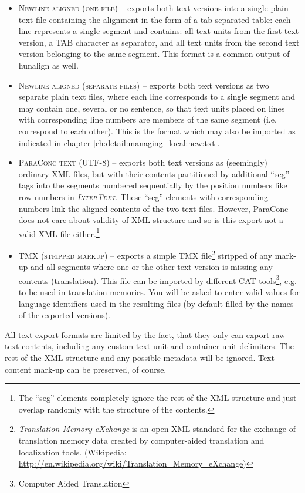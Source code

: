 \documentclass[a4paper,10pt,oneside]{book}
\newcommand{\IT}{\textit{\textsc{InterText}}\xspace}
\newcommand{\menu}[1]{\textsc{#1}}
\begin{document}
\begin{itemize}
 \item \menu{Newline aligned (one file)} -- exports both text versions into a single plain text file containing the alignment in the form of a tab-separated table: each line represents a single segment and contains: all text units from the first text version, a TAB character as separator, and all text units from the second text version belonging to the same segment. This format is a common output of hunalign as well.
 \item \menu{Newline aligned (separate files)} -- exports both text versions as two separate plain text files, where each line corresponds to a single segment and may contain one, several or no sentence, so that text units placed on lines with corresponding line numbers are members of the same segment (i.e. correspond to each other). This is the format which may also be imported as indicated in chapter \ref{ch:detail:managing_local:new:txt}.
 \item \menu{ParaConc text (UTF-8)} -- exports both text versions as (seemingly) ordinary XML files, but with their contents partitioned by additional ``seg'' tags into the segments numbered sequentially by the position numbers like row numbers in \IT. These ``seg'' elements with corresponding numbers link the aligned contents of the two text files. However, ParaConc does not care about validity of XML structure and so is this export not a valid XML file either.\footnote{The ``seg'' elements completely ignore the rest of the XML structure and just overlap randomly with the structure of the contents.}
 \item \menu{TMX (stripped markup)} -- exports a simple TMX file\footnote{\emph{Translation Memory eXchange} is an open XML standard for the exchange of translation memory data created by computer-aided translation and localization tools. (Wikipedia: \url{http://en.wikipedia.org/wiki/Translation_Memory_eXchange})} stripped of any mark-up and all segments where one or the other text version is missing any contents (translation). This file can be imported by different CAT tools\footnote{Computer Aided Translation}, e.g. to be used in translation memories. You will be asked to enter valid values for language identifiers used in the resulting files (by default filled by the names of the exported versions).
\end{itemize}

All text export formats are limited by the fact, that they only can export raw text contents, including any custom text unit and container unit delimiters. The rest of the XML structure and any possible metadata will be ignored. Text content mark-up can be preserved, of course.
\end{document}
